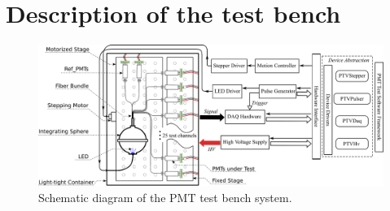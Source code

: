 \documentclass{nst}
\begin{document}
\section{Description of the test bench}
\label{sec:description}

\begin{figure}[!htb]
	\centering
	\includegraphics[width=150mm]{FIG1}
	\caption{Schematic diagram of the PMT test bench system.}
	\label{fig:FIG1}
\end{figure}
\end{document}
